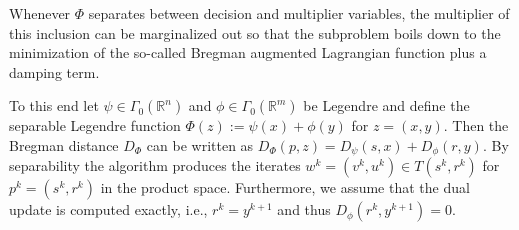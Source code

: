 \documentclass[11pt,onecolumn]{article}
\newcommand{\bR}{\mathbb{R}}
\theoremstyle{remark}
\begin{document}
Whenever $\Phi$ separates between decision and multiplier variables, the multiplier of this inclusion can be marginalized out so that the subproblem boils down to the minimization of the so-called Bregman augmented Lagrangian function plus a damping term.

To this end let $\psi \in \Gamma_0(\bR^n)$ and $\phi \in \Gamma_0(\bR^m)$ be Legendre and define the separable Legendre function $\Phi(z):=\psi(x)+\phi(y)$ for $z=(x,y)$. Then the Bregman distance $D_\Phi$ can be written as $D_\Phi(p, z)=D_\psi(s,x) + D_\phi(r, y)$. By separability the algorithm produces the iterates $w^k = (v^{k}, u^{k}) \in T(s^{k}, r^{k})$ for $p^k=(s^{k}, r^{k})$ in the product space. Furthermore, we assume that the dual update is computed exactly, i.e., $r^{k}=y^{k+1}$ and thus $D_{\phi}(r^{k}, y^{k+1})=0$.
\end{document}

